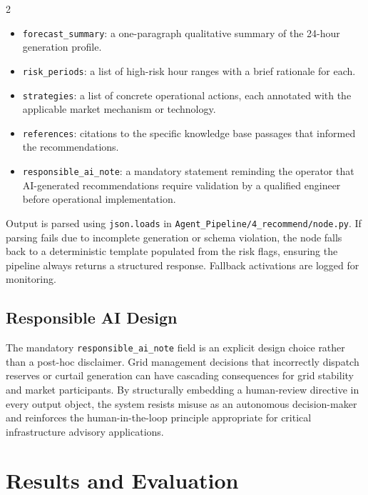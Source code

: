 \documentclass[11pt]{article}
\begin{document}
\begin{multicols}{2}
\begin{itemize}
  \item \texttt{forecast\_summary}: a one-paragraph qualitative summary of
        the 24-hour generation profile.
  \item \texttt{risk\_periods}: a list of high-risk hour ranges with a brief
        rationale for each.
  \item \texttt{strategies}: a list of concrete operational actions, each
        annotated with the applicable market mechanism or technology.
  \item \texttt{references}: citations to the specific knowledge base passages
        that informed the recommendations.
  \item \texttt{responsible\_ai\_note}: a mandatory statement reminding the
        operator that AI-generated recommendations require validation by a
        qualified engineer before operational implementation.
\end{itemize}

Output is parsed using \texttt{json.loads} in
\texttt{Agent\_Pipeline/4\_recommend/node.py}. If parsing fails due to
incomplete generation or schema violation, the node falls back to a
deterministic template populated from the risk flags, ensuring the pipeline
always returns a structured response. Fallback activations are logged for
monitoring.

\subsection{Responsible AI Design}

The mandatory \texttt{responsible\_ai\_note} field is an explicit design choice
rather than a post-hoc disclaimer. Grid management decisions that incorrectly
dispatch reserves or curtail generation can have cascading consequences for
grid stability and market participants. By structurally embedding a
human-review directive in every output object, the system resists misuse as an
autonomous decision-maker and reinforces the human-in-the-loop principle
appropriate for critical infrastructure advisory applications.

\newpage
\section{Results and Evaluation}


\end{multicols}
\end{document}
